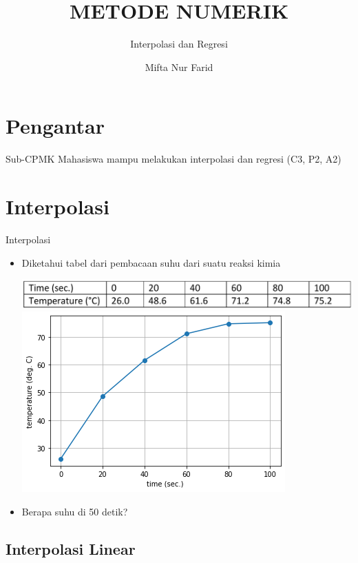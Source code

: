 \documentclass[pdflatex,compress,mathserif]{beamer}
\title{METODE NUMERIK}
\subtitle{Interpolasi dan Regresi}
\author{Mifta Nur Farid}
\begin{document}
\maketitle

\section{Pengantar}

\begin{frame}{Sub-CPMK}
	Mahasiswa mampu melakukan interpolasi dan regresi (C3, P2, A2)
\end{frame}

\section{Interpolasi}

\begin{frame}{Interpolasi}
	\begin{itemize}
		\item Diketahui tabel dari pembacaan suhu dari suatu reaksi kimia
		\begin{center}
			\includegraphics[width=\linewidth]{img/img01}
			\includegraphics[width=0.7\linewidth]{img/img02}
		\end{center}
		\item Berapa suhu di 50 detik?
	\end{itemize}
\end{frame}

\subsection{Interpolasi Linear}
\end{document}

